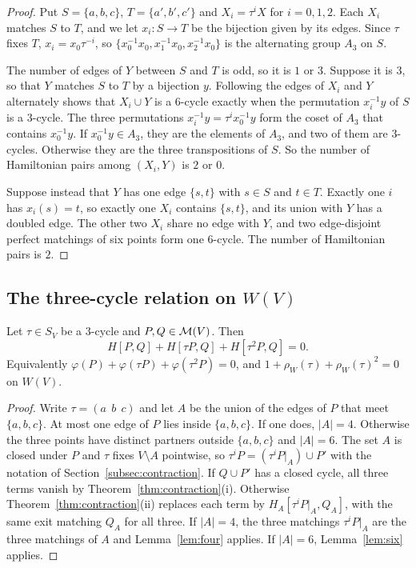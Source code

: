 \begin{proof}
Put $S=\{a,b,c\}$, $T=\{a',b',c'\}$ and $X_i=\tau^{i}X$ for $i=0,1,2$. Each $X_i$ matches $S$ to $T$, and we let $x_i\colon S\to T$ be the bijection given by its edges. Since $\tau$ fixes $T$, $x_i=x_0\tau^{-i}$, so $\{x_0^{-1}x_0,x_1^{-1}x_0,x_2^{-1}x_0\}$ is the alternating group $A_3$ on $S$.

The number of edges of $Y$ between $S$ and $T$ is odd, so it is $1$ or $3$. Suppose it is $3$, so that $Y$ matches $S$ to $T$ by a bijection $y$. Following the edges of $X_i$ and $Y$ alternately shows that $X_i\cup Y$ is a $6$-cycle exactly when the permutation $x_i^{-1}y$ of $S$ is a $3$-cycle. The three permutations $x_i^{-1}y=\tau^{i}x_0^{-1}y$ form the coset of $A_3$ that contains $x_0^{-1}y$. If $x_0^{-1}y\in A_3$, they are the elements of $A_3$, and two of them are $3$-cycles. Otherwise they are the three transpositions of $S$. So the number of Hamiltonian pairs among $(X_i,Y)$ is $2$ or $0$.

Suppose instead that $Y$ has one edge $\{s,t\}$ with $s\in S$ and $t\in T$. Exactly one $i$ has $x_i(s)=t$, so exactly one $X_i$ contains $\{s,t\}$, and its union with $Y$ has a doubled edge. The other two $X_i$ share no edge with $Y$, and two edge-disjoint perfect matchings of six points form one $6$-cycle. The number of Hamiltonian pairs is $2$.
\end{proof}

\subsection{The three-cycle relation on \texorpdfstring{$W(V)$}{W(V)}}

\begin{theorem}\label{thm:threecycle}
Let $\tau\in S_V$ be a $3$-cycle and $P,Q\in\mathcal{M}(V)$. Then
\[
H[P,Q]+H[\tau P,Q]+H[\tau^{2}P,Q]=0.
\]
Equivalently $\varphi(P)+\varphi(\tau P)+\varphi(\tau^{2}P)=0$, and $1+\rho_W(\tau)+{\rho_W(\tau)}^2=0$ on $W(V)$.
\end{theorem}

\begin{proof}
Write $\tau=(a\;\,b\;\,c)$ and let $A$ be the union of the edges of $P$ that meet $\{a,b,c\}$. At most one edge of $P$ lies inside $\{a,b,c\}$. If one does, $|A|=4$. Otherwise the three points have distinct partners outside $\{a,b,c\}$ and $|A|=6$. The set $A$ is closed under $P$ and $\tau$ fixes $V\setminus A$ pointwise, so $\tau^{i}P=(\tau^{i}P|_A)\cup P'$ with the notation of Section~\ref{subsec:contraction}. If $Q\cup P'$ has a closed cycle, all three terms vanish by Theorem~\ref{thm:contraction}(i). Otherwise Theorem~\ref{thm:contraction}(ii) replaces each term by $H_A[\tau^{i}P|_A,Q_A]$, with the same exit matching $Q_A$ for all three. If $|A|=4$, the three matchings $\tau^{i}P|_A$ are the three matchings of $A$ and Lemma~\ref{lem:four} applies. If $|A|=6$, Lemma~\ref{lem:six} applies.
\end{proof}

